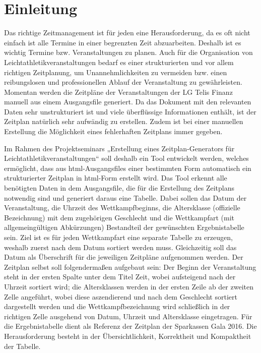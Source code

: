
\chapter{Einleitung}
\label{chap:Einleitung}

Das richtige Zeitmanagement ist für jeden eine Herausforderung, da es oft nicht einfach ist alle Termine in einer begrenzten Zeit abzuarbeiten. Deshalb ist es wichtig Termine bzw. Veranstaltungen zu planen. Auch für die Organisation von Leichtathletikveranstaltungen bedarf es einer strukturierten und vor allem richtigen Zeitplanung, um Unannehmlichkeiten zu vermeiden bzw. einen reibungslosen und professionellen Ablauf der Veranstaltung zu gewährleisten. Momentan werden die Zeitpläne der Veranstaltungen der LG Telis Finanz manuell aus einem Ausgangsfile generiert. Da das Dokument mit den relevanten Daten sehr unstrukturiert ist und viele überflüssige Informationen enthält, ist der Zeitplan natürlich sehr aufwändig zu erstellen. Zudem ist bei einer manuellen Erstellung die Möglichkeit eines fehlerhaften Zeitplans immer gegeben.

Im Rahmen des Projektseminars „Erstellung eines Zeitplan-Generators für Leichtathletikveranstaltungen“ soll deshalb ein Tool entwickelt werden, welches ermöglicht, dass aus html-Ausgangsfiles einer bestimmten Form automatisch ein strukturierter Zeitplan in html-Form erstellt wird. Das Tool erkennt alle benötigten Daten in dem Ausgangsfile, die für die Erstellung des Zeitplans notwendig sind und generiert daraus eine Tabelle. Dabei sollen das Datum der Veranstaltung, die Uhrzeit des Wettkampfbeginns, die Altersklasse (offizielle Bezeichnung) mit dem zugehörigen Geschlecht und die Wettkampfart (mit allgemeingültigen Abkürzungen) Bestandteil der gewünschten Ergebnistabelle sein. Ziel ist es für jeden Wettkampfart eine separate Tabelle zu erzeugen, weshalb zuerst nach dem Datum sortiert werden muss. Gleichzeitig soll das Datum als Überschrift für die jeweiligen Zeitpläne aufgenommen werden. Der Zeitplan selbst soll folgendermaßen aufgebaut sein: Der Beginn der Veranstaltung steht in der ersten Spalte unter dem Titel Zeit, wobei aufsteigend nach der Uhrzeit sortiert wird; die Altersklassen werden in der ersten Zeile ab der zweiten Zelle angeführt, wobei diese aszendierend und nach dem Geschlecht sortiert dargestellt werden und die Wettkampfbezeichnung wird schließlich in der richtigen Zelle ausgehend von Datum, Uhrzeit und Altersklasse eingetragen. Für die Ergebnistabelle dient als Referenz der Zeitplan der Sparkassen Gala 2016. Die Herausforderung besteht in der Übersichtlichkeit, Korrektheit und Kompaktheit der Tabelle.

